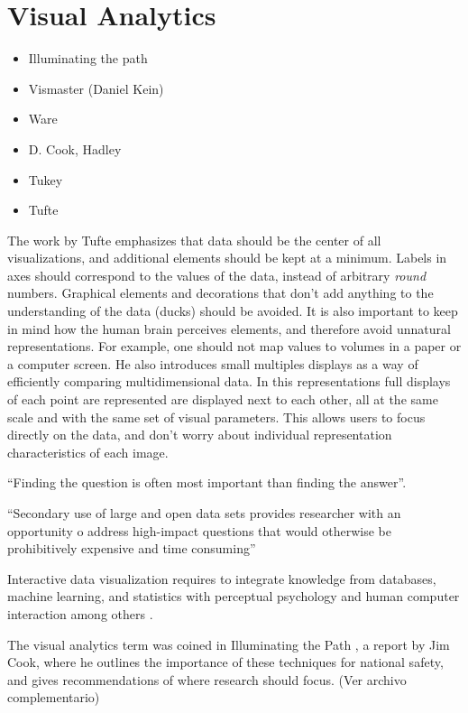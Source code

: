 
\section{Visual Analytics}
\begin{itemize}
	\item Illuminating the path
	\item Vismaster (Daniel Kein)	
	\item Ware
	\item D. Cook, Hadley
	\item Tukey
	\item Tufte	
\end{itemize}	

The work by Tufte \autocite{tufte_visual_1983} emphasizes that data should be the center of all visualizations, and additional elements should be kept at a minimum. Labels in axes should correspond to the values of the data, instead of arbitrary \emph{round} numbers. Graphical elements and decorations that don't add anything to the understanding of the data (ducks) should be avoided. It is also important to keep in mind how the human brain perceives elements, and therefore avoid unnatural representations. For example, one should not map values to volumes in a paper or a computer screen. He also introduces small multiples displays as a way of efficiently comparing multidimensional data. In this representations full displays of each point are represented are displayed next to each other, all at the same scale and with the same set of visual parameters. This allows users to focus directly on the data, and don't worry about individual representation characteristics of each image.

``Finding the question is often most important than finding the answer''\autocite{tukey_we_1980}.


``Secondary use of large and open data sets provides researcher with an opportunity o address high-impact questions that would otherwise be prohibitively expensive and time consuming'' \autocite{viangteeravat_giving_2014}



Interactive data visualization requires to integrate knowledge from databases, machine learning, and statistics with perceptual psychology and human computer interaction among others \autocite{ward_interactive_2010}.


The visual analytics term was coined in Illuminating the Path \autocite{cook_illuminating_2005}, a report by Jim Cook, where he outlines the importance of these techniques for national safety, and gives recommendations of 	where research should focus. (Ver archivo complementario)
	
